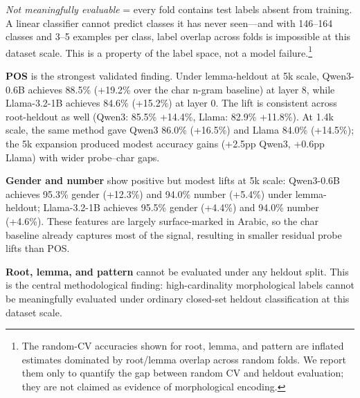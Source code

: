 \documentclass[11pt,a4paper]{article}
\begin{document}
\begin{table}[t]
\centering\footnotesize
\caption{POS lemma-heldout across two models at 4,701-stimulus scale. Lift survives despite radically different tokenization (Llama: 0\% single-token, Qwen3: 15.9\%). Both models extract the period token (final token of the fixed prompt template).}

\end{table}

\begin{table}[t]
\centering\small
\caption{Gender and number lemma-heldout lifts in Qwen3-0.6B and Llama-3.2-1B at 5k scale. Both tasks show positive but modest lifts over char n-gram baselines.}

\end{table}
\clearpage

\textit{Not meaningfully evaluable} = every fold contains test labels absent from training. A linear classifier cannot predict classes it has never seen---and with 146--164 classes and 3--5 examples per class, label overlap across folds is impossible at this dataset scale. This is a property of the label space, not a model failure.\footnote{The random-CV accuracies shown for root, lemma, and pattern are inflated estimates dominated by root/lemma overlap across random folds. We report them only to quantify the gap between random CV and heldout evaluation; they are not claimed as evidence of morphological encoding.}

\textbf{POS} is the strongest validated finding. Under lemma-heldout at 5k scale, Qwen3-0.6B achieves 88.5\% (+19.2\% over the char n-gram baseline) at layer 8, while Llama-3.2-1B achieves 84.6\% (+15.2\%) at layer 0. The lift is consistent across root-heldout as well (Qwen3: 85.5\% +14.4\%, Llama: 82.9\% +11.8\%). At 1.4k scale, the same method gave Qwen3 86.0\% (+16.5\%) and Llama 84.0\% (+14.5\%); the 5k expansion produced modest accuracy gains (+2.5pp Qwen3, +0.6pp Llama) with wider probe--char gaps.

\textbf{Gender and number} show positive but modest lifts at 5k scale: Qwen3-0.6B achieves 95.3\% gender (+12.3\%) and 94.0\% number (+5.4\%) under lemma-heldout; Llama-3.2-1B achieves 95.5\% gender (+4.4\%) and 94.0\% number (+4.6\%). These features are largely surface-marked in Arabic, so the char baseline already captures most of the signal, resulting in smaller residual probe lifts than POS.

\textbf{Root, lemma, and pattern} cannot be evaluated under any heldout split. This is the central methodological finding: high-cardinality morphological labels cannot be meaningfully evaluated under ordinary closed-set heldout classification at this dataset scale.
\end{document}
